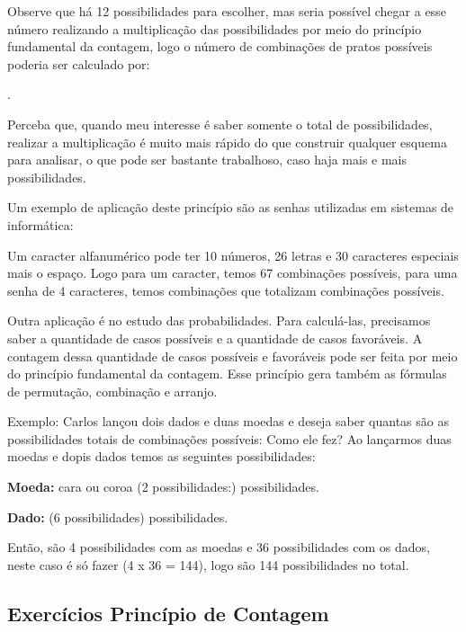\begin{multicols*}{2}
	Observe que há 12 possibilidades para escolher, mas seria possível chegar a esse número realizando a multiplicação das possibilidades por meio do princípio fundamental da contagem, logo o número de combinações de pratos possíveis poderia ser calculado por:

	.

	Perceba que, quando meu interesse é saber somente o total de possibilidades, realizar a multiplicação é muito mais rápido do que construir qualquer esquema para analisar, o que pode ser bastante trabalhoso, caso haja mais e mais possibilidades.

	Um exemplo de aplicação deste princípio são as senhas utilizadas em sistemas de informática:

	Um caracter alfanumérico pode ter 10 números, 26 letras e 30 caracteres especiais mais o espaço. Logo para um caracter, temos 67 combinações possíveis, para uma senha de 4 caracteres, temos  combinações que totalizam   combinações possíveis.

	Outra aplicação é no estudo das probabilidades. Para calculá-las, precisamos saber a quantidade de casos possíveis e a quantidade de casos favoráveis. A contagem dessa quantidade de casos possíveis e favoráveis pode ser feita por meio do princípio fundamental da contagem. Esse princípio gera também as fórmulas de permutação, combinação e arranjo.

	Exemplo: Carlos lançou dois dados e duas moedas e deseja saber quantas são as possibilidades totais de combinações possíveis: Como ele fez?
	Ao lançarmos duas moedas e dopis dados temos as seguintes possibilidades:

	\textbf{Moeda:} cara ou coroa (2 possibilidades:)   possibilidades.

	\textbf{Dado:}  (6 possibilidades)  possibilidades.

	Então, são 4 possibilidades com as moedas e 36 possibilidades com os dados, neste caso é só fazer (4 x 36 = 144), logo são 144 possibilidades no total.

	\subsection{Exercícios Princípio de Contagem}


\end{multicols*}
